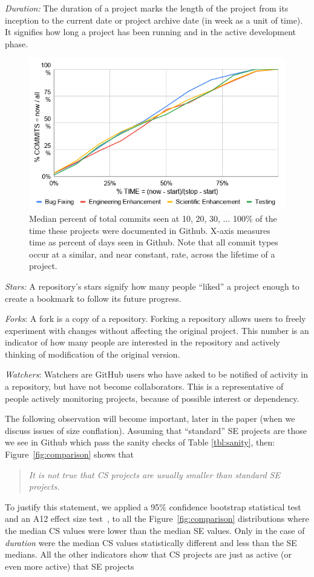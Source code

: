 \documentclass[sigconf,review,anonymous]{acmart}
\begin{document}
\textit{Duration:} The duration of a project marks the length of the project from its inception to the current date or project archive date (in week as a unit of time). It signifies how long a project has been running and in the active development phase.



\begin{figure}[!b]
\begin{center}\includegraphics[width=.6\linewidth]{img/belief1_1.png}\end{center} 
\caption{Median percent  of total commits seen
at 10, 20, 30, ... 100\% of 
the time these projects were
documented in Github.
X-axis measures time as percent of days seen in Github.
Note
that all commit types occur
at a similar, and near constant,
 rate, across the lifetime of a project.}\label{fig:belief1} 
\end{figure}

\textit{Stars:} A repository's stars signify how many people
  ``liked'' a project enough to create a bookmark to follow its future progress.
  
   \textit{Forks}: A fork is a copy of a repository. Forking a repository allows users to freely experiment with changes without affecting the original project. This number
  is an indicator of how many people are interested in the repository and actively thinking
  of modification of the original version.
  
   \textit{Watchers}: Watchers are GitHub users who have asked to be notified of activity in a repository, but have not become collaborators. This is a representative of people actively monitoring projects, because of possible interest or dependency.
   
  
  The following observation  
  will become important, later in the paper (when we discuss issues of size conflation).
Assuming that ``standard'' SE projects are those we see in Github which pass the sanity checks of Table \ref{tbl:sanity}, then:
 Figure~\ref{fig:comparison} shows that
  \begin{quote}
  {\em It is not true that CS projects are usually smaller than standard SE projects.}
  \end{quote}
 To justify this statement, we applied 
  a 95\% confidence bootstrap statistical test~\cite{efron94} and an A12 effect size test~\cite{arcuri2011practical}, to all the  Figure~\ref{fig:comparison} distributions where the median CS values were lower than the median SE values.
Only in the case of {\em duration} were the median CS values statistically different and less than the SE medians. All the other indicators show that CS projects are just as active (or even more active) that SE projects 
\end{document}

